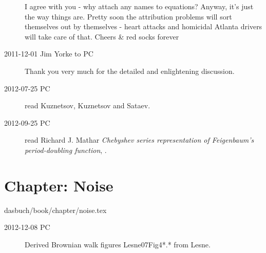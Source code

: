 \begin{description}
I agree with you - why attach any names to equations? Anyway, it's just
the way things are. Pretty soon the attribution problems will sort
themselves out by themselves - heart attacks and homicidal Atlanta
drivers will take care of that. Cheers \& red socks forever

\item[2011-12-01 Jim Yorke to PC] Thank you very much for the detailed
and enlightening discussion.

\item[2012-07-25 PC] read
Kuznetsov, Kuznetsov and Sataev.

\item[2012-09-25 PC] read Richard J. Mathar \emph{Chebyshev series
representation of Feigenbaum's period-doubling function},
.

\end{description}

%

\section{Chapter: Noise}
\label{c-noise}\noindent dasbuch/book/chapter/noise.tex
\begin{description}
\item[2012-12-08 PC] Derived Brownian walk figures
Lesne07Fig4*.* from Lesne.
                    \toCB

\end{description}

%

